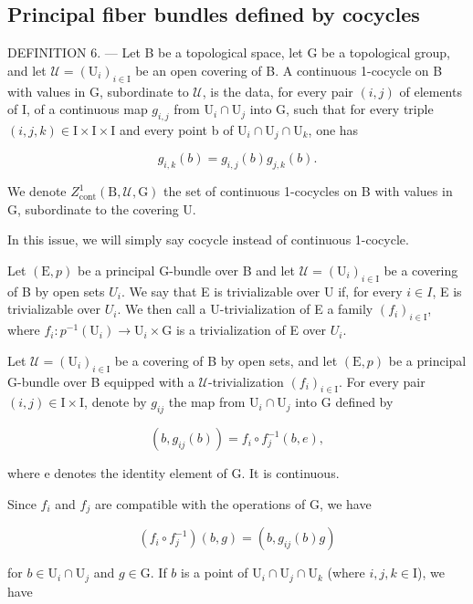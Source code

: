 \subsection{Principal fiber bundles defined by cocycles}

DEFINITION 6. --- Let B be a topological space, let G be a topological group, and let \(\mathcal{U} = (\mathrm{U}_{i})_{i\in \mathrm{I}}\) be an open covering of B. A continuous 1-cocycle on B with values in G, subordinate to \(\mathcal{U}\), is the data, for every pair \((i,j)\) of elements of I, of a continuous map \(g_{i,j}\) from \(\mathrm{U}_i\cap \mathrm{U}_j\) into G, such that for every triple \((i,j,k)\in \mathrm{I}\times \mathrm{I}\times \mathrm{I}\) and every point b of \(\mathrm{U}_i\cap \mathrm{U}_j\cap \mathrm{U}_k\), one has

\[
g _ {i, k} (b) = g _ {i, j} (b) g _ {j, k} (b).
\]

We denote \(Z_{\mathrm{cont}}^{1}(\mathrm{B},\mathcal{U},\mathrm{G})\) the set of continuous 1-cocycles on B with values in G, subordinate to the covering U.

In this issue, we will simply say cocycle instead of continuous 1-cocycle.

Let \((\mathrm{E},p)\) be a principal G-bundle over B and let \(\mathcal{U} = (\mathrm{U}_{i})_{i\in\mathrm{I}}\) be a covering of B by open sets \(U_{i}\). We say that E is trivializable over U if, for every \(i\in I\), E is trivializable over \(U_{i}\). We then call a U-trivialization of E a family \((f_{i})_{i\in\mathrm{I}}\), where \(f_{i}\colon p^{-1}(\mathrm{U}_{i})\to\mathrm{U}_{i}\times\mathrm{G}\) is a trivialization of E over \(U_{i}\).

Let \(\mathcal{U} = (\mathrm{U}_i)_{i\in \mathrm{I}}\) be a covering of B by open sets, and let \((\mathrm{E},p)\) be a principal G-bundle over B equipped with a \(\mathcal{U}\)-trivialization \((f_i)_{i\in \mathrm{I}}\). For every pair \((i,j)\in \mathrm{I}\times \mathrm{I}\), denote by \(g_{ij}\) the map from \(\mathrm{U}_i\cap \mathrm{U}_j\) into G defined by

\[
(b, g _ {i j} (b)) = f _ {i} \circ f _ {j} ^ {- 1} (b, e),
\]

where e denotes the identity element of G. It is continuous.

Since \(f_{i}\) and \(f_{j}\) are compatible with the operations of G, we have

\[
(f _ {i} \circ f _ {j} ^ {- 1}) (b, g) = (b, g _ {i j} (b) g)
\]

for \(b \in \mathrm{U}_i \cap \mathrm{U}_j\) and \(g \in \mathrm{G}\). If \(b\) is a point of \(\mathrm{U}_i \cap \mathrm{U}_j \cap \mathrm{U}_k\) (where \(i, j, k \in \mathrm{I}\)), we have

